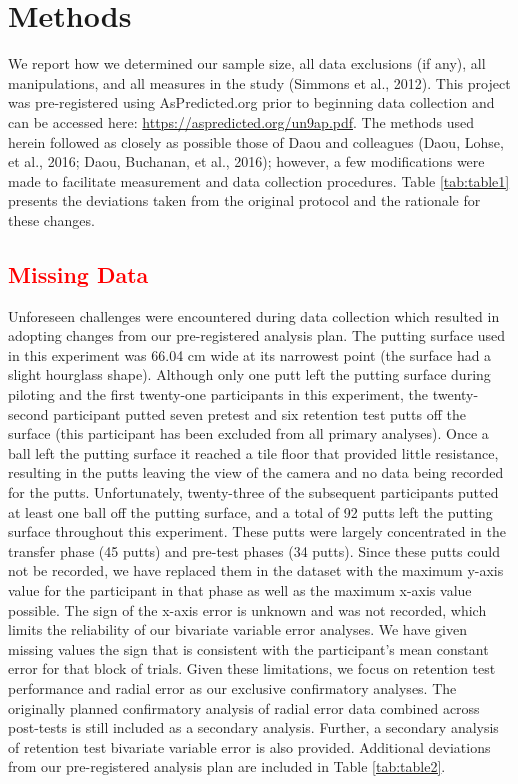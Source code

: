 \documentclass[
  english,
  man,floatsintext]{apa7}
\begin{document}
\hypertarget{methods}{%
\section{Methods}\label{methods}}

We report how we determined our sample size, all data exclusions (if any), all manipulations, and all measures in the study (Simmons et al., 2012). This project was pre-registered using AsPredicted.org prior to beginning data collection and can be accessed here: \url{https://aspredicted.org/un9ap.pdf}. The methods used herein followed as closely as possible those of Daou and colleagues (Daou, Lohse, et al., 2016; Daou, Buchanan, et al., 2016); however, a few modifications were made to facilitate measurement and data collection procedures. Table \ref{tab:table1} presents the deviations taken from the original protocol and the rationale for these changes.

\hypertarget{section}{%
\subsection{\texorpdfstring{\textcolor{red}{Missing Data}}{}}\label{section}}

Unforeseen challenges were encountered during data collection which resulted in adopting changes from our pre-registered analysis plan. The putting surface used in this experiment was 66.04 cm wide at its narrowest point (the surface had a slight hourglass shape). Although only one putt left the putting surface during piloting and the first twenty-one participants in this experiment, the twenty-second participant putted seven pretest and six retention test putts off the surface (this participant has been excluded from all primary analyses). Once a ball left the putting surface it reached a tile floor that provided little resistance, resulting in the putts leaving the view of the camera and no data being recorded for the putts. Unfortunately, twenty-three of the subsequent participants putted at least one ball off the putting surface, and a total of 92 putts left the putting surface throughout this experiment. These putts were largely concentrated in the transfer phase (45 putts) and pre-test phases (34 putts). Since these putts could not be recorded, we have replaced them in the dataset with the maximum y-axis value for the participant in that phase as well as the maximum x-axis value possible. The sign of the x-axis error is unknown and was not recorded, which limits the reliability of our bivariate variable error analyses. We have given missing values the sign that is consistent with the participant's mean constant error for that block of trials. Given these limitations, we focus on retention test performance and radial error as our exclusive confirmatory analyses. The originally planned confirmatory analysis of radial error data combined across post-tests is still included as a secondary analysis. Further, a secondary analysis of retention test bivariate variable error is also provided. Additional deviations from our pre-registered analysis plan are included in Table \ref{tab:table2}.
\end{document}
